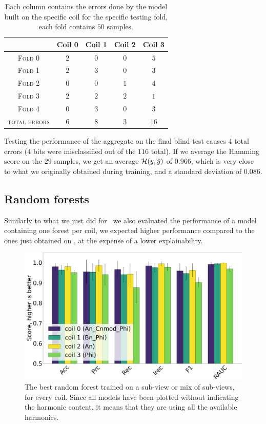 \begin{table}[!ht]
	\caption{Each column contains the errors done by the model built on the specific coil for
	the specific testing fold, each fold contains $50$ samples.}\label{tbl:dt-errors}

	\bigskip
	\setlength{\tabcolsep}{6pt}
	\centering
	\begin{tabular}{ccccc}
		\toprule
		\textbf{}                     & \textbf{Coil 0}    & \textbf{Coil 1} & \textbf{Coil 2} & \textbf{Coil 3}
		\\
		\midrule
		\textsc{Fold 0}         & $2$           & $0$           & $0$            & $5$            \\
		\textsc{Fold 1}         & $2$		& $3$		& $0$            & $3$		  \\
		\textsc{Fold 2}		& $0$           & $0$		& $1$            & $4$            \\
		\textsc{Fold 3}         & $2$           & $2$ 		& $2$            & $1$            \\
		\textsc{Fold 4}         & $0$		& $3$           & $0$            & $3$            \\
		\midrule
		\textsc{total errors}	& $6$		& $8$		& $3$		& $16$
		\\
		\bottomrule
	\end{tabular}
\end{table}

Testing the performance of the aggregate on the final blind-test causes $4$ total errors ($4$ bits
were misclassified out of the $116$ total). If we average the Hamming score on the $29$ samples, we
get an average $\mathcal{H}(y, \hat{y})$ of $0.966$, which is very close to what we originally obtained during training, and a standard deviation of $0.086$.

\subsection{Random forests}
Similarly to what we just did for \dts\ we also evaluated the performance of a model containing one forest per coil, we expected higher performance compared to the ones just obtained on \dts, at the expense of a lower explainability.

\begin{figure}[!ht]
	\centering
	\includegraphics[width=0.7\linewidth]{img/best_rfs_qlp.png}
	\caption{The best random forest trained on a sub-view or mix of sub-views, for every coil.
		Since all models have been plotted without indicating the harmonic content, it means
		that they are using all the available harmonics.}\label{fig:brfs-qlp}
\end{figure}

